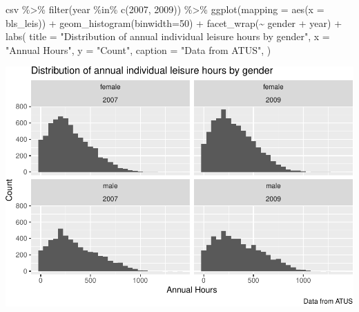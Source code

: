 \documentclass[
]{article}
\newenvironment{Shaded}{\begin{snugshade}}{\end{snugshade}}
\newcommand{\AttributeTok}[1]{\textcolor[rgb]{0.77,0.63,0.00}{#1}}
\newcommand{\DecValTok}[1]{\textcolor[rgb]{0.00,0.00,0.81}{#1}}
\newcommand{\FunctionTok}[1]{\textcolor[rgb]{0.00,0.00,0.00}{#1}}
\newcommand{\NormalTok}[1]{#1}
\newcommand{\SpecialCharTok}[1]{\textcolor[rgb]{0.00,0.00,0.00}{#1}}
\newcommand{\StringTok}[1]{\textcolor[rgb]{0.31,0.60,0.02}{#1}}
\begin{document}
\begin{Shaded}
\begin{Highlighting}[]
\NormalTok{csv }\SpecialCharTok{\%\textgreater{}\%}
  \FunctionTok{filter}\NormalTok{(year }\SpecialCharTok{\%in\%} \FunctionTok{c}\NormalTok{(}\DecValTok{2007}\NormalTok{, }\DecValTok{2009}\NormalTok{)) }\SpecialCharTok{\%\textgreater{}\%}
  \FunctionTok{ggplot}\NormalTok{(}\AttributeTok{mapping =} \FunctionTok{aes}\NormalTok{(}\AttributeTok{x =}\NormalTok{ bls\_leis)) }\SpecialCharTok{+}
  \FunctionTok{geom\_histogram}\NormalTok{(}\AttributeTok{binwidth=}\DecValTok{50}\NormalTok{) }\SpecialCharTok{+}
  \FunctionTok{facet\_wrap}\NormalTok{(}\SpecialCharTok{\textasciitilde{}}\NormalTok{ gender }\SpecialCharTok{+}\NormalTok{ year) }\SpecialCharTok{+}
  \FunctionTok{labs}\NormalTok{(}
  \AttributeTok{title =} \StringTok{"Distribution of annual individual leisure hours by gender"}\NormalTok{,}
  \AttributeTok{x =} \StringTok{"Annual Hours"}\NormalTok{,}
  \AttributeTok{y =} \StringTok{"Count"}\NormalTok{,}
  \AttributeTok{caption =} \StringTok{"Data from ATUS"}\NormalTok{,}
\NormalTok{)}
\end{Highlighting}
\end{Shaded}

\includegraphics{Paper2_files/figure-latex/graphs-4.pdf}
\end{document}
